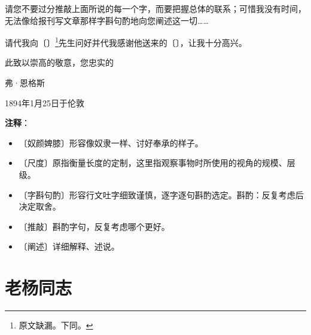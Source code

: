 \documentclass[12pt,UTF-8,openany]{ctexbook}
\begin{document}
\begin{normalsize}
    请您不要过分推敲上面所说的每一个字，而要把握总体的联系；可惜我没有时间，无法像给报刊写文章那样字斟句酌地向您阐述这一切……
    
    请代我向〔\phantom{某某}〕\footnote{原文缺漏。下同。}先生问好并代我感谢他送来的〔\phantom{某某}〕，让我十分高兴。
    
    \vspace{36pt}
    
    \begin{flushright}
        此致以崇高的敬意，您忠实的~~~~\phantom{弗·恩格斯}
        
        弗·恩格斯
        
        1894年1月25日于伦敦
        
    \end{flushright}
    
    
    
\end{normalsize}


\newpage

\textbf{注释}：

\vspace{-1em}

\begin{itemize}
    \setlength\itemsep{-0.2em}
    \item 〔奴颜婢膝〕形容像奴隶一样、讨好奉承的样子。
    \item 〔尺度〕原指衡量长度的定制，这里指观察事物时所使用的视角的规模、层级。
    \item 〔字斟句酌〕形容行文吐字细致谨慎，逐字逐句斟酌选定。斟酌：反复考虑后决定取舍。
    \item 〔推敲〕斟酌字句，反复考虑哪个更好。
    \item 〔阐述〕详细解释、述说。
\end{itemize}

\chapter{老杨同志}
\end{document}
